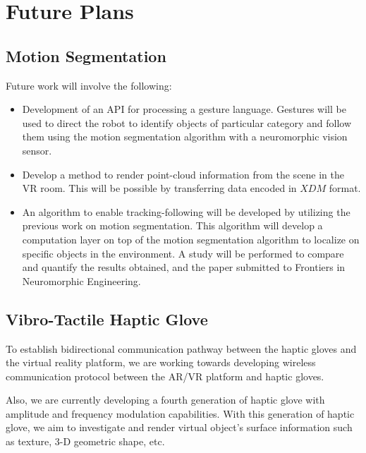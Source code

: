 \chapter{Future Plans}
\section{Motion Segmentation }
Future work will involve the following:
\begin{itemize}
\item Development of an API for processing a gesture language. Gestures will be used to direct the robot to identify objects of particular category and follow them using the motion segmentation algorithm with a neuromorphic vision sensor.
  
\item Develop a method to render point-cloud information from the scene in the VR room. This will be possible by transferring data encoded in $XDM$ format.
	
\item An algorithm to enable tracking-following will be developed by utilizing the previous work on motion segmentation. This algorithm will develop a computation layer on top of the motion segmentation algorithm to localize on specific objects in the environment. A study will be performed to compare and quantify the results obtained, and the paper submitted to Frontiers in Neuromorphic Engineering. 
\end{itemize}

\section{Vibro-Tactile Haptic Glove}
To establish bidirectional communication pathway between the haptic
gloves and the virtual reality platform, we are working towards
developing wireless communication protocol between the AR/VR platform
and haptic gloves.

Also, we are currently developing a fourth generation of haptic glove with amplitude and frequency modulation capabilities. With this generation of haptic glove, we aim to investigate and render virtual object’s surface information such as texture, 3-D geometric shape, etc.  
